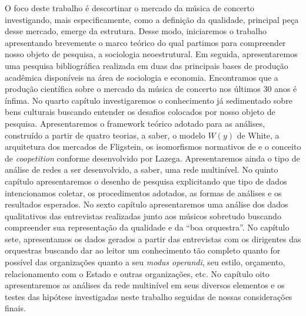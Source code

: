 \documentclass[a4paper, 12pt, openright, oneside, german, french, english, brazil]{abntex2}
\begin{document}
	O foco deste trabalho é descortinar o mercado da música de concerto investigando, mais especificamente, como a definição da qualidade, principal peça desse mercado, emerge da estrutura. Desse modo, iniciaremos o trabalho apresentando brevemente o marco teórico do qual partimos para compreender nosso objeto de pesquisa, a sociologia neoestrutural. Em seguida, apresentaremos uma pesquisa bibliográfica realizada em duas das principais bases de produção acadêmica disponíveis na área de sociologia e economia. Encontramos que a produção científica sobre o mercado da música de concerto nos últimos 30 anos é ínfima. No quarto capítulo investigaremos o conhecimento já sedimentado sobre bens culturais buscando entender os desafios colocados por nosso objeto de pesquisa. Apresentaremos o framework teórico adotado para as análises, construído a partir de quatro teorias, a saber, o modelo $W(y)$ de White, a arquitetura dos mercados de Fligstein, os isomorfismos normativos de  e o conceito de \textit{coopetition} conforme desenvolvido por Lazega. Apresentaremos ainda o tipo de análise de redes a ser desenvolvido, a saber, uma rede multinível. No quinto capítulo apresentaremos o desenho de pesquisa explicitando que tipo de dados intencionamos coletar, os procedimentos adotados, as formas de análises e os resultados esperados. No sexto capítulo apresentaremos uma análise dos dados qualitativos das entrevistas realizadas junto aos músicos sobretudo buscando compreender sua representação da qualidade e da ``boa orquestra''. No capítulo sete, apresentamos os dados gerados a partir das entrevistas com os dirigentes das orquestras buscando dar ao leitor um conhecimento tão completo quanto for possível das organizações quanto a seu \textit{modus operandi}, seu estilo, orçamento, relacionamento com o Estado e outras organizações, etc. No capítulo oito apresentaremos as análises da rede multinível em seus diversos elementos e os testes das hipótese investigadas neste trabalho seguidas de nossas considerações finais.



\end{document}
